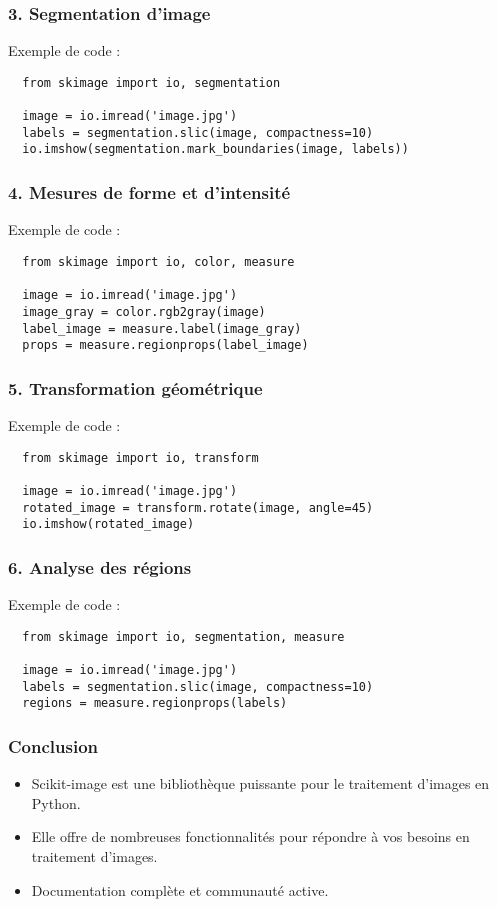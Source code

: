   \begin{frame}[fragile]
    \frametitle{3. Segmentation d'image}
    \begin{block}{Exemple de code :}
      \begin{verbatim}
  from skimage import io, segmentation
  
  image = io.imread('image.jpg')
  labels = segmentation.slic(image, compactness=10)
  io.imshow(segmentation.mark_boundaries(image, labels))
      \end{verbatim}
    \end{block}
  \end{frame}
  
  \begin{frame}[fragile]
    \frametitle{4. Mesures de forme et d'intensité}
    \begin{block}{Exemple de code :}
      \begin{verbatim}
  from skimage import io, color, measure
  
  image = io.imread('image.jpg')
  image_gray = color.rgb2gray(image)
  label_image = measure.label(image_gray)
  props = measure.regionprops(label_image)
      \end{verbatim}
    \end{block}
  \end{frame}
  
  \begin{frame}[fragile]
    \frametitle{5. Transformation géométrique}
    \begin{block}{Exemple de code :}
      \begin{verbatim}
  from skimage import io, transform
  
  image = io.imread('image.jpg')
  rotated_image = transform.rotate(image, angle=45)
  io.imshow(rotated_image)
      \end{verbatim}
    \end{block}
  \end{frame}
  
  \begin{frame}[fragile]
    \frametitle{6. Analyse des régions}
    \begin{block}{Exemple de code :}
      \begin{verbatim}
  from skimage import io, segmentation, measure
  
  image = io.imread('image.jpg')
  labels = segmentation.slic(image, compactness=10)
  regions = measure.regionprops(labels)
      \end{verbatim}
    \end{block}
  \end{frame}
  
  \begin{frame}
    \frametitle{Conclusion}
    \begin{itemize}
      \item Scikit-image est une bibliothèque puissante pour le traitement d'images en Python.
      \item Elle offre de nombreuses fonctionnalités pour répondre à vos besoins en traitement d'images.
      \item Documentation complète et communauté active.
    \end{itemize}
  \end{frame}